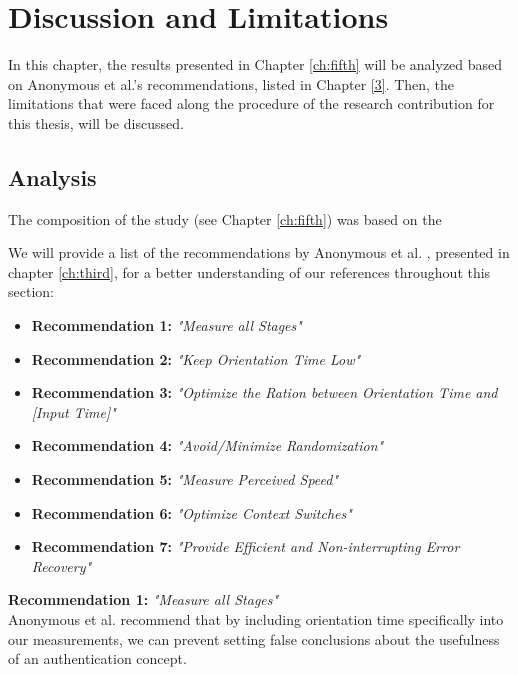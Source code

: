 
\chapter{Discussion and Limitations}\label{ch:sixth}

In this chapter, the results presented in Chapter \ref{ch:fifth} will be analyzed based on Anonymous et al.'s recommendations, listed in Chapter \ref{3}. Then, the limitations that were faced along the procedure of the research contribution for this thesis, will be discussed.

\section{Analysis}

The composition of the study (see Chapter \ref{ch:fifth}) was based on the 

We will provide a list of the recommendations by Anonymous et al. \cite{anonymous}, presented in chapter \ref{ch:third}, for a better understanding of our references throughout this section: 

\begin{itemize}
    \item \textbf{Recommendation 1:} \textit{"Measure all Stages"}
    \item \textbf{Recommendation 2:} \textit{"Keep Orientation Time Low"}
    \item \textbf{Recommendation 3:} \textit{"Optimize the Ration between Orientation Time and [Input Time]"} 
    \item \textbf{Recommendation 4:} \textit{"Avoid/Minimize Randomization"}
    \item \textbf{Recommendation 5:} \textit{"Measure Perceived Speed"}
    \item \textbf{Recommendation 6:} \textit{"Optimize Context Switches"}
    \item \textbf{Recommendation 7:} \textit{"Provide Efficient and Non-interrupting Error Recovery"}
\end{itemize}



\textbf{Recommendation 1:} \textit{"Measure all Stages"}\\
Anonymous et al. \cite{anonymous} recommend that by including orientation time specifically into our measurements, we can prevent setting false conclusions about the usefulness of an authentication concept. 

